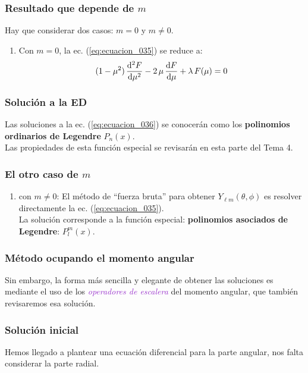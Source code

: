 \documentclass[12pt]{beamer}
\begin{document}
\begin{frame}
\frametitle{Resultado que depende de $m$}
Hay que considerar dos casos: $m = 0$ y $m \neq 0$.
\pause
{}
\begin{enumerate}[<+->]
\item Con $m = 0$, la ec. (\ref{eq:ecuacion_035}) se reduce a:
\pause
\begin{align}
(1 - \mu^{2}) \, \dv[2]{F}{\mu} - 2  \, \mu \, \dv{F}{\mu} + \lambda \, F(\mu) = 0
\label{eq:ecuacion_036}
\end{align}
\seti
\end{enumerate}
\end{frame}
\begin{frame}
\frametitle{Solución a la ED}
Las soluciones a la ec. (\ref{eq:ecuacion_036}) se conocerán como los \textbf{\textcolor{blue(munsell)}{polinomios ordinarios de Legendre}} $P_{n} (x)$.
\\
\bigskip
\pause
Las propiedades de esta función especial se revisarán en esta parte del Tema 4.
\end{frame}
\begin{frame}
\frametitle{El otro caso de $m$}
\begin{enumerate}[<+->]
\conti
\item con $m \neq 0$: \pause El método de \enquote{fuerza bruta} para obtener $Y_{\ell m} (\theta, \phi)$ es resolver directamente la ec. (\ref{eq:ecuacion_035}).
\\
\bigskip
\pause
La solución corresponde a la función especial: \textbf{\textcolor{carmine}{polinomios asociados de Legendre}}: $P_{l}^{m} (x)$.
\end{enumerate}
\end{frame}
\begin{frame}
\frametitle{Método ocupando el momento angular}
Sin embargo, \pause la forma más sencilla y elegante de obtener las soluciones es mediante el uso de los \emph{\textcolor{darkorchid}{operadores de escalera}} del momento angular, que también revisaremos esa solución.
\end{frame}
\begin{frame}
\frametitle{Solución inicial}
Hemos llegado a plantear una ecuación diferencial para la parte angular, \pause nos falta considerar la parte radial.
\end{frame}
\end{document}
